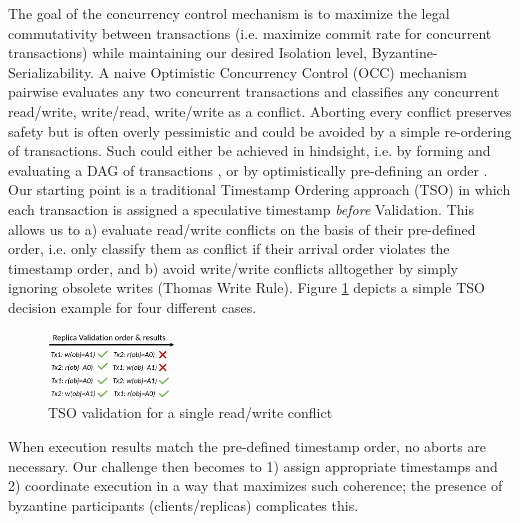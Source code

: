 

The goal of the concurrency control mechanism is to maximize the legal commutativity between transactions (i.e. maximize commit rate for concurrent transactions) while maintaining our desired Isolation level, Byzantine-Serializability. A naive Optimistic Concurrency Control (OCC) mechanism pairwise evaluates any two concurrent transactions and classifies any concurrent read/write, write/read, write/write as a conflict. Aborting every conflict preserves safety but is often overly pessimistic and could be avoided by a simple re-ordering of transactions. Such could either be achieved in hindsight, i.e. by forming and evaluating a DAG of transactions \cite{sharma2018databasify}, or by optimistically pre-defining an order \cite{adya1995efficient, Zhang2015}.
Our starting point is a traditional Timestamp Ordering approach (TSO) \cite{zhang2015tapir, adya1995efficient} in which each transaction is assigned a speculative timestamp \textit{before} Validation. This allows us to a) evaluate read/write conflicts on the basis of their pre-defined order, i.e. only classify them as conflict if their arrival order violates the timestamp order, and b) avoid write/write conflicts alltogether by simply ignoring obsolete writes \cite{thomas1979majority}(Thomas Write Rule). Figure \ref{fig:TSO} depicts a simple TSO decision example for four different cases.

\begin{figure}
\begin{center}
\includegraphics[width= 0.3\textwidth]{./figures/TSO.png}
\end{center}
\caption{TSO validation for a single read/write conflict}
\label{fig:TSO}
\end{figure}
When execution results match the pre-defined timestamp order, no aborts are necessary. Our challenge then becomes to 1) assign appropriate timestamps and 2) coordinate execution in a way that maximizes such coherence; the presence of byzantine participants (clients/replicas) complicates this.

